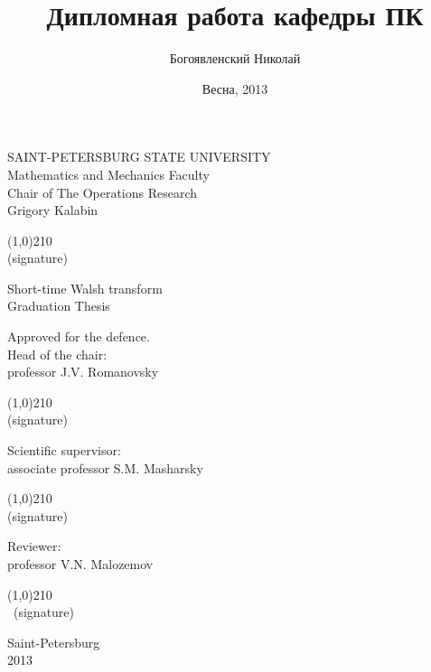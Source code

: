 \documentclass[a4paper, 14pt]{extarticle}
\title{Дипломная работа кафедры ПК}
\author{Богоявленский Николай}
\date{Весна, 2013}
\begin{document}
\begin{titlepage}
    \thispagestyle{empty}
    \begin{center}
        SAINT-PETERSBURG STATE UNIVERSITY\\
        Mathematics and Mechanics Faculty\\
        Chair of The Operations Research\\
        \bigskip
        \bigskip
        Grigory Kalabin
    \end{center}
    \begin{flushright}
        \hspace{85mm} \line(1,0){210}\\
        \hspace{85mm} \small{(signature)}
    \end{flushright}
    \begin{center}
        Short-time Walsh transform\\
        \bigskip
        \small{Graduation Thesis}
    \end{center}
    \vfill
    \begin{flushleft}
        \hspace{85mm} \small{Approved for the defence.}\\
        \hspace{85mm} \small{Head of the chair:}\\
        \hspace{85mm} \small{professor J.V. Romanovsky}
        \begin{flushright}
           \hspace{85mm} \line(1,0){210}\\
           \small{(signature)}
        \end{flushright}

        \hspace{85mm} \small{Scientific supervisor:}\\
        \hspace{85mm} \small{associate professor S.M. Masharsky}
        \begin{flushright}
           \hspace{85mm} \line(1,0){210}\\
           \small{(signature)}
        \end{flushright}
        
        \hspace{85mm} \small{Reviewer:}\\
        \hspace{85mm} \small{professor V.N. Malozemov}
        \begin{flushright}
            \hspace{85mm} \line(1,0){210}\\\
            \small{(signature)}
        \end{flushright}
    \end{flushleft}
    \begin{center}
        \bigskip
        \small{Saint-Petersburg}\\
        \small{2013}\\
    \end{center}
\end{titlepage} 
\end{document}
